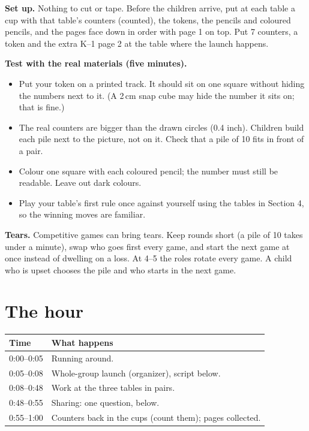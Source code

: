 \documentclass[10pt]{article}
\newcommand{\hd}{\rowcolor{head}}
\begin{document}
\textbf{Set up.} Nothing to cut or tape. Before the children arrive, put at
each table a cup with that table's counters (counted), the tokens, the
pencils and coloured pencils, and the pages face down in order with page 1 on
top. Put 7 counters, a token and the extra K--1 page 2 at the table where the
launch happens.

\textbf{Test with the real materials (five minutes).}
\begin{itemize}
\item Put your token on a printed track. It should sit on one square without
hiding the numbers next to it. (A 2\,cm snap cube may hide the number it sits
on; that is fine.)
\item The real counters are bigger than the drawn circles (0.4 inch). Children
build each pile next to the picture, not on it. Check that a pile of 10 fits
in front of a pair.
\item Colour one square with each coloured pencil; the number must still be
readable. Leave out dark colours.
\item Play your table's first rule once against yourself using the tables in
Section 4, so the winning moves are familiar.
\end{itemize}

\textbf{Tears.} Competitive games can bring tears. Keep rounds short (a pile
of 10 takes under a minute), swap who goes first every game, and start the next
game at once instead of dwelling on a loss. At 4--5 the roles rotate every
game. A child who is upset chooses the pile and who starts in the next game.

\section{The hour}

\noindent\begin{tabularx}{\linewidth}{@{}L{0.95in}Y@{}}
\toprule
\hd Time & What happens \\
:00--0:05 & Running around. \\
0:05--0:08 & Whole-group launch (organizer), script below. \\
0:08--0:48 & Work at the three tables in pairs. \\
0:48--0:55 & Sharing: one question, below. \\
0:55--1:00 & Counters back in the cups (count them); pages collected. \\
\bottomrule
\end{tabularx}
\end{document}
